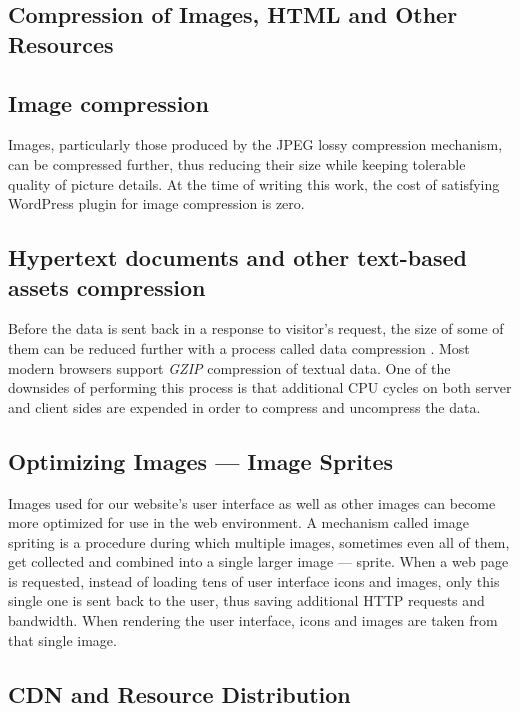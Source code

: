\subsection{Compression of Images, HTML and Other Resources}

\subsection*{Image compression}

Images, particularly those produced by the JPEG lossy compression mechanism, can be compressed further, thus reducing their size while keeping tolerable quality of picture details. At the time of writing this work, the cost of satisfying WordPress plugin \cite{WP-Plugin:EWWW-Image-Optimizer} for image compression is zero.

\subsection*{Hypertext documents and other text-based assets compression}

Before the data is sent back in a response to visitor’s request, the size of some of them can be reduced further with a process called data compression \cite{Study:Google-compression}. Most modern browsers \cite{Study:SO-gzip-browser-support} support \emph{GZIP} compression of textual data. One of the downsides of performing this process is that additional CPU cycles on both server and client sides are expended in order to compress and uncompress the data.

\subsection{Optimizing Images — Image Sprites}

Images used for our website's user interface as well as other images can become more optimized for use in the web environment. A mechanism called image spriting \cite{Study:CSSwizardy-image-spriting} is a procedure during which multiple images, sometimes even all of them, get collected and combined into a single larger image — sprite. When a web page is requested, instead of loading tens of user interface icons and images, only this single one is sent back to the user, thus saving additional HTTP requests and bandwidth. When rendering the user interface, icons and images are taken from that single image.

\subsection{CDN and Resource Distribution}

